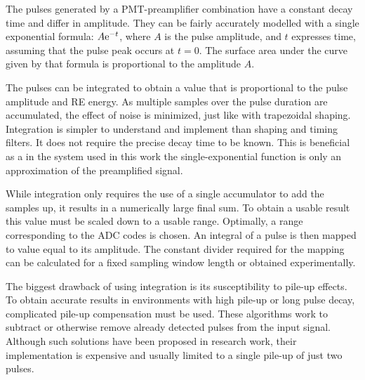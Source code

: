 The pulses generated by a PMT-preamplifier combination
have a constant decay time and differ in amplitude.
They can be fairly accurately modelled with a 
single exponential formula: $A {\rm e}^{-t}$, where $A$ is
the pulse amplitude, and $t$ expresses time, assuming that 
the pulse peak occurs at $t=0$. The surface area
under the curve given by that formula is proportional 
to the amplitude $A$.


The pulses can be integrated to obtain a value that is proportional
to the pulse amplitude and RE energy. As multiple samples
over the pulse duration are accumulated, the effect of noise
is minimized, just like with trapezoidal shaping.
Integration is simpler to understand and implement
than shaping and timing filters. It does not require
the precise decay time to be known. This is beneficial 
as a in the system used in this work the 
single-exponential function is only an approximation 
of the preamplified signal.


While integration only requires the use of a single accumulator 
to add the samples up, it results in a numerically large final sum. 
To obtain a usable result this value must be scaled down to a usable range.
Optimally, a range corresponding to the ADC codes is chosen.
An integral of a pulse is then mapped to value equal to its amplitude.
The constant divider required for the mapping
can be calculated for a fixed sampling window length
or obtained experimentally. 


The biggest drawback of using integration is its 
susceptibility to pile-up effects. To obtain accurate results
in environments with high pile-up or long pulse decay, complicated 
pile-up compensation must be used. These algorithms 
work to subtract or otherwise remove already detected pulses
from the input signal.
Although such solutions have been proposed in research work,
their implementation is expensive and usually limited to a single
pile-up of just two pulses. \cite{pileup_correction}

